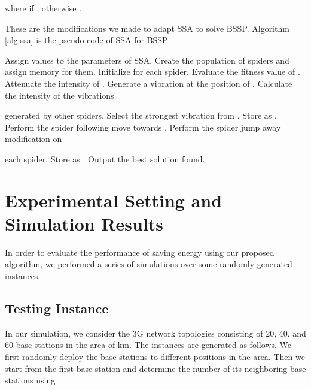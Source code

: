 \documentclass[conference]{IEEEtran}
\begin{document}
where  if , otherwise .

These are the modifications we made to adapt SSA to solve BSSP. Algorithm \ref{alg:ssa} is the pseudo-code of SSA for BSSP

\begin{algorithm}
\caption{}
  \begin{algorithmic}[1]
  \State Assign values to the parameters of SSA.
  \State Create the population of spiders  and assign memory for them.
  \State Initialize  for each spider.
      \State Evaluate the fitness value of .
      \State Attenuate the intensity of .
      \State Generate a vibration at the position of .
    \EndFor
      \State Calculate the intensity of the vibrations  \par\hspace{0.7em} generated by other spiders.
      \State Select the strongest vibration  from .
        \State Store  as .
      \EndIf
      \State Perform the spider following move towards .
      \State Perform the spider jump away modification on \par\hspace{0.7em} each spider.
      \State Store  as .
    \EndFor
  \EndWhile
  \State Output the best solution found.
  \end{algorithmic}
  \label{alg:ssa}
\end{algorithm}

\section{Experimental Setting and Simulation Results}\label{sec:simr}

In order to evaluate the performance of saving energy using our proposed algorithm, we performed a series of simulations over some randomly generated instances.

\subsection{Testing Instance}

In our simulation, we consider the 3G network topologies consisting of 20, 40, and 60 base stations in the area of  km. The instances are generated as follows. We first randomly deploy the base stations to different positions in the area. Then we start from the first base station and determine the number of its neighboring base stations using
\end{document}
